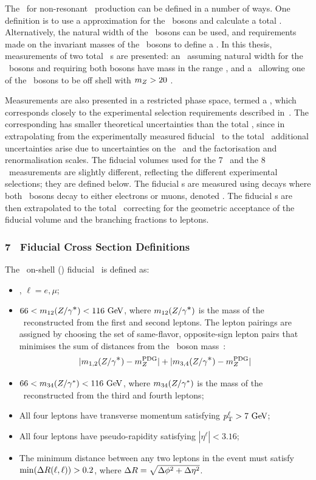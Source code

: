 The \cx\ for non-resonant \ZZ\ production can be defined in a number of
ways. One definition is to use a  approximation for the \Z\ bosons and
calculate a total \cx. Alternatively, the natural width of the \Z\
bosons can be used, and requirements made on the invariant masses of the \Z\
bosons to define a \cx. In this thesis, measurements of two total \ZZ\ \cx s
are presented: an \intro{on-shell} \cx\, assuming natural width for the
\Z\ bosons and requiring both bosons have mass in the range \sstooosZ, and a
\cx\ allowing one of the \Z\ bosons to be off shell with $m_{Z}>20$
\gev.

Measurements are also presented in a restricted phase space, termed a
, which corresponds closely to the experimental selection
requirements described in~\chap{ObjEventSelection}. The corresponding
\intro{fiducial \cx} has smaller theoretical uncertainties than the total \cx,
since in extrapolating from the experimentally measured
fiducial \cx\ to the total \cx\ additional uncertainties arise due to uncertainties on the \partDF\ and
the factorisation and renormalisation scales. The fiducial volumes used for the
7 \tev\ and the 8 \tev\ measurements are slightly different, reflecting the
different experimental selections; they are defined below. The fiducial
\cx s are measured using decays where both \Z\ bosons decay to either electrons
or muons, denoted \ZZllll. The fiducial
\cx s are then extrapolated to the total \cx\ correcting for
the geometric acceptance of the fiducial volume and the branching
fractions to leptons.

\subsubsection{7 \tev\ Fiducial Cross Section Definitions}

The \ZZllll\ on-shell (\ZZ) fiducial \cx\ is defined as:

\begin{itemize}
\item{\ZorgZorgllll, $\ell = e,\mu$;}
\item{ $66 < m_{12}(\Zorgv) <  116\GeV$, where $m_{12}(Z/\gamma^{\textstyle *})$ is
the mass of the \Z\ reconstructed from the first and second leptons.  The
lepton pairings are assigned by choosing the set of 
same-flavor, opposite-sign lepton pairs that minimises the sum of distances from
the \Z\ boson mass~\cite{PDG}:
\begin{equation}
|m_{1,2}(Z/\gamma^{\textstyle *}) - m_{Z}^{\rm PDG}| + |m_{3,4}(Z/\gamma^{\textstyle *}) - m_{Z}^{\rm PDG}|
\end{equation}
}
\item{ $66 < m_{34}(\Z/\gamma^*) <  116\GeV$, where $m_{34}(Z/\gamma^*)$ is
the mass of the \Z\ reconstructed from the third and fourth leptons;}
\item All four leptons have transverse momentum satisfying $\pT^{\ell} > 7\GeV$;
\item All four leptons have pseudo-rapidity satisfying $|\eta^{\ell}| < 3.16$;
\item{ The minimum distance between any two leptons in the event must satisfy
$\mathrm{min}(\Delta R(\ell,\ell)) > 0.2$, where $\Delta R = \sqrt{\Delta \phi^{2} +
\Delta \eta^{2}}$.}
\end{itemize}

